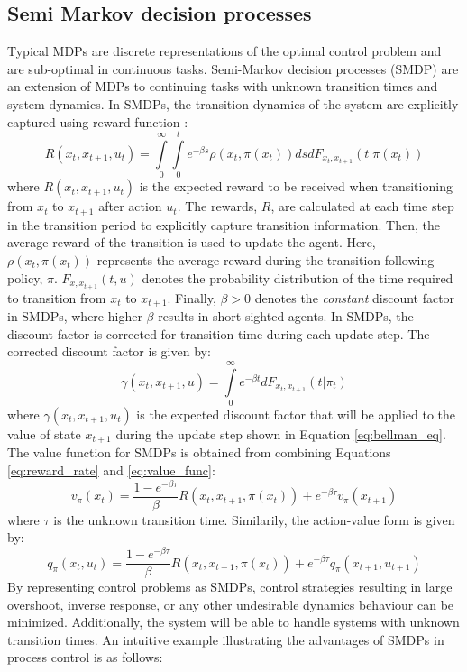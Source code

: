 \subsection{Semi Markov decision processes}
Typical MDPs are discrete representations of the optimal control problem and are sub-optimal in continuous tasks. Semi-Markov decision processes (SMDP) are an extension of MDPs to continuing tasks with unknown transition times and system dynamics. In SMDPs, the transition dynamics of the system are explicitly captured using reward function \cite{continuous_rl_ref14}:
\begin{equation}
R(x_t, x_{t+1}, u_t) = \int\limits^\infty_0 \int\limits^t_0 e^{-\beta s} \rho(x_t, \pi (x_t))dsdF_{x_t, x_{t+1}}(t | \pi (x_t))
\label{eq:reward_rate}    
\end{equation}
where $R(x_t, x_{t+1}, u_t)$ is the expected reward to be received when transitioning from $x_t$ to $x_{t+1}$ after action $u_t$. The rewards, $R$, are calculated at each time step in the transition period to explicitly capture transition information. Then, the average reward of the transition is used to update the agent. Here, $\rho(x_t, \pi(x_t))$ represents the average reward during the transition following policy, $\pi$. $F_{x, x_{t+1}}(t, u)$ denotes the probability distribution of the time required to transition from $x_t$ to $x_{t+1}$.  Finally, $\beta > 0$ denotes the \textit{constant} discount factor in SMDPs, where higher $\beta$ results in short-sighted agents. In SMDPs, the discount factor is corrected for transition time during each update step.  The corrected discount factor is given by:
\begin{equation}
    \gamma(x_t, x_{t+1}, u) = \int\limits^{\infty}_0 e^{-\beta t} dF_{x_t, x_{t+1}}(t | \pi_t)
\end{equation}
where $\gamma (x_t, x_{t+1}, u_t)$ is the expected discount factor that will be applied to the value of state $x_{t+1}$ during the update step shown in Equation \ref{eq:bellman_eq}. The value function for SMDPs is obtained from combining Equations \ref{eq:reward_rate} and \ref{eq:value_func}:
\begin{equation}
v_{\pi}(x_t) = \frac{1 - e^{-\beta \tau}}{\beta} R(x_t, x_{t+1}, \pi(x_t)) + e^{-\beta \tau}v_{\pi}(x_{t+1})
\end{equation}
where $\tau$ is the unknown transition time.  Similarily, the action-value form is given by:
\begin{equation}
    q_{\pi}(x_t, u_t) = \frac{1 - e^{-\beta \tau}}{\beta} R(x_t, x_{t+1}, \pi(x_t)) + e^{-\beta \tau}  q_{\pi}(x_{t+1}, u_{t+1})
\end{equation}
By representing control problems as SMDPs, control strategies resulting in large overshoot, inverse response, or any other undesirable dynamics behaviour can be minimized. Additionally, the system will be able to handle systems with unknown transition times.  An intuitive example illustrating the advantages of SMDPs in process control is as follows:

